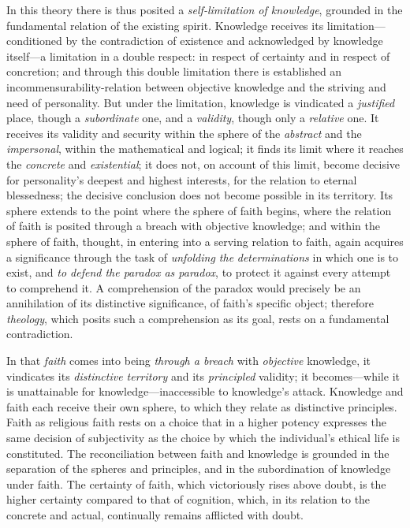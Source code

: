 \documentclass[12pt,a4paper]{book}
\begin{document}
In this theory there is thus posited a \emph{self-limitation of knowledge},
grounded in the fundamental relation of the existing spirit. Knowledge
receives its limitation---conditioned by the contradiction of existence
and acknowledged by knowledge itself---a limitation in a double respect:
in respect of certainty and in respect of concretion; and through this
double limitation there is established an incommensurability-relation
between objective knowledge and the striving and need of personality.
But under the limitation, knowledge is vindicated a \emph{justified} place,
though a \emph{subordinate} one, and a \emph{validity}, though only a \emph{relative} one.
It receives its validity and security within the sphere of the \emph{abstract}
and the \emph{impersonal}, within the mathematical and logical; it finds its
limit where it reaches the \emph{concrete} and \emph{existential}; it does not, on
account of this limit, become decisive for personality's deepest and
highest interests, for the relation to eternal blessedness; the
decisive conclusion does not become possible in its territory. Its
sphere extends to the point where the sphere of faith begins, where the
relation of faith is posited through a breach with objective knowledge;
and within the sphere of faith, thought, in entering into a serving
relation to faith, again acquires a significance through the task of
\emph{unfolding the}
\emph{determinations} in which one is to exist, and \emph{to defend the paradox as
paradox}, to protect it against every attempt to comprehend it. A
comprehension of the paradox would precisely be an annihilation of its
distinctive significance, of faith's specific object; therefore \emph{theology},
which posits such a comprehension as its goal, rests on a fundamental
contradiction.

In that \emph{faith} comes into being \emph{through a breach} with \emph{objective} knowledge,
it vindicates its \emph{distinctive territory} and its \emph{principled} validity; it
becomes---while it is unattainable for knowledge---inaccessible to
knowledge's attack. Knowledge and faith each receive their own sphere,
to which they relate as distinctive principles. Faith as religious faith
rests on a choice that in a higher potency expresses the same decision
of subjectivity as the choice by which the individual's ethical life is
constituted. The reconciliation between faith and knowledge is grounded
in the separation of the spheres and principles, and in the
subordination of knowledge under faith. The certainty of faith, which
victoriously rises above doubt, is the higher certainty compared to that
of cognition, which, in its relation to the concrete and actual,
continually remains afflicted with doubt.
\end{document}
